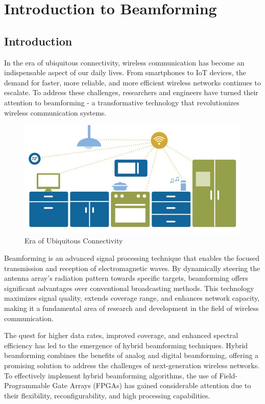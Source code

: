 \chapter{Introduction to Beamforming}

\section[Introduction]{\textbf{Introduction}}
In the era of ubiquitous connectivity, wireless communication has become an indispensable aspect of our daily lives. From smartphones to IoT devices, the demand for faster, more reliable, and more efficient wireless networks continues to escalate. To address these challenges, researchers and engineers have turned their attention to beamforming - a transformative technology that revolutionizes wireless communication systems.

\begin{figure}[htb]
\centering
	\includegraphics[scale=0.5]{Chapter1/Figures/era}	
	\caption{\label{fig:era}Era of Ubiquitous Connectivity}
\end{figure}

Beamforming is an advanced signal processing technique that enables the focused transmission and reception of electromagnetic waves. By dynamically steering the antenna array's radiation pattern towards specific targets, beamforming offers significant advantages over conventional broadcasting methods. This technology maximizes signal quality, extends coverage range, and enhances network capacity, making it a fundamental area of research and development in the field of wireless communication.

The quest for higher data rates, improved coverage, and enhanced spectral efficiency has led to the emergence of hybrid beamforming techniques. Hybrid beamforming combines the benefits of analog and digital beamforming, offering a promising solution to address the challenges of next-generation wireless networks. To effectively implement hybrid beamforming algorithms, the use of Field-Programmable Gate Arrays (FPGAs) has gained considerable attention due to their flexibility, reconfigurability, and high processing capabilities.

